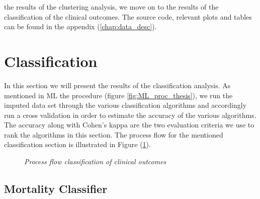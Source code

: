 \documentclass[../thesis.tex]{subfiles}
\begin{document}
the results of the clustering analysis, we move on to the results of the classification of the clinical outcomes. The source code, relevant plots and tables can be found in the appendix (\ref{chap:data_desc}).

\section{Classification}

\noindent In this section we will present the results of the classification analysis. As mentioned in ML the procedure (figure \ref{fig:ML_proc_thesis}), we run the imputed data set through the various classification algorithms and accordingly run a cross validation in order to estimate the accuracy of the various algorithms. The accuracy along with Cohen’s kappa are the two evaluation criteria we use to rank the algorithms in this section. The process flow for the mentioned classification section is illustrated in Figure (\ref{fig:process_flow_classification}). 

\begin{figure}
    \centering
    
    \caption[Process flow classification of clinical outcomes]{\textit{Process flow classification of clinical outcomes}}
    \label{fig:process_flow_classification}
\end{figure}

\subsection{Mortality Classifier}
\end{document}
